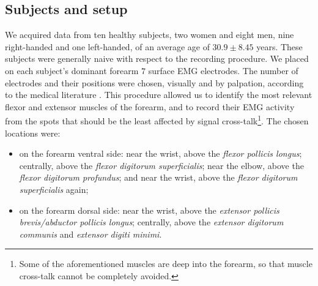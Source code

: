 
\subsection{Subjects and setup}

We acquired data from ten healthy subjects, two women and eight men,
nine right-handed and one left-handed, of an average age of $30.9 \pm
8.45$ years. These subjects were generally naive with respect to the
recording procedure. We placed on each subject's dominant forearm $7$
surface EMG electrodes. The number of electrodes and their positions
were chosen, visually and by palpation, according to the medical
literature \cite{Kendall}. This procedure allowed us
to identify the most relevant flexor and extensor muscles of the
forearm, and to record their EMG activity from the spots that should
be the least affected by signal cross-talk\footnote{Some of the
aforementioned muscles are deep into the forearm, so that muscle
cross-talk cannot be completely avoided.}. The chosen locations were:

\begin{itemize}

  \item on the forearm ventral side: near the wrist, above the
     \emph{flexor pollicis longus}; centrally, above the \emph{flexor
     digitorum superficialis}; near the elbow, above the \emph{flexor
     digitorum profundus}; and near the wrist, above the \emph{flexor
     digitorum superficialis} again;

  \item on the forearm dorsal side: near the wrist, above the
     \emph{extensor pollicis brevis/abductor pollicis longus};
     centrally, above the \emph{extensor digitorum communis} and
     \emph{extensor digiti minimi}.

\end{itemize}


